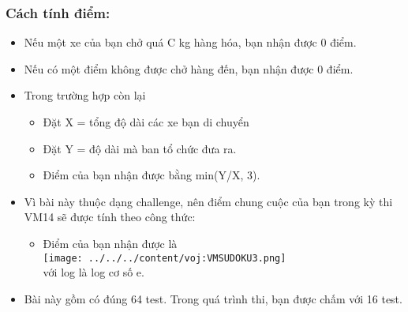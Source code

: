 \subsubsection{Cách tính điểm:}
\begin{itemize}
	\item Nếu một xe của bạn chở quá C kg hàng hóa, bạn nhận được 0 điểm.
	\item Nếu có một điểm không được chở hàng đến, bạn nhận được 0 điểm.
	\item Trong trường hợp còn lại                                 

 
\begin{itemize}
	\item Đặt X = tổng độ dài các xe bạn di chuyển
	\item Đặt Y = độ dài mà ban tổ chức đưa ra.
	\item Điểm của bạn nhận được bằng min(Y/X, 3).
\end{itemize}
	\item Vì bài này thuộc dạng challenge, nên điểm chung cuộc của bạn trong kỳ thi VM14 sẽ được tính theo công thức:                             


\begin{itemize}
item Giả sử điểm của bạn đứng thứ i (nghĩa là có i-1 người điểm cao hơn bạn).
	\item Điểm của bạn nhận được là  
\\
\texttt{[image: ../../../content/voj:VMSUDOKU3.png]}
\\ với log là log cơ số e.
\end{itemize}
	\item Bài này gồm có đúng 64 test. Trong quá trình thi, bạn được chấm với 16 test.                  

 
\begin{itemize}
\end{itemize}
\end{itemize}

